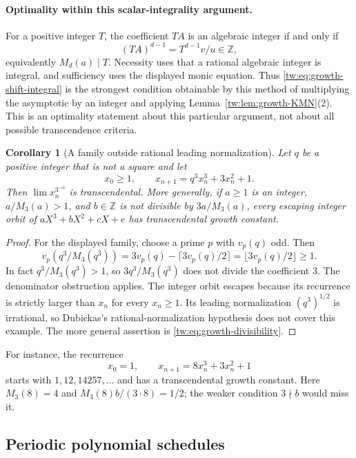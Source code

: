 \documentclass[11pt,a4paper]{article}
\newtheorem{corollary}[theorem]{Corollary}
\theoremstyle{definition}
\theoremstyle{remark}
\numberwithin{equation}{section}
\begin{document}
\paragraph{Optimality within this scalar-integrality argument.}
For a positive integer $T$, the coefficient $TA$ is an algebraic
integer if and only if
\[
 (TA)^{d-1}=T^{d-1}v/u\in\mathbb Z,
\]
equivalently $M_d(a)\mid T$.  Necessity uses that a rational algebraic
integer is integral, and sufficiency uses the displayed monic equation.
Thus \eqref{tw:eq:growth-shift-integral} is the strongest condition
obtainable by this method of multiplying the asymptotic by an integer
and applying Lemma~\ref{tw:lem:growth-KMN}(2).  This is an optimality
statement about this particular argument, not about all possible
transcendence criteria.

\begin{corollary}[A family outside rational leading normalization]
Let $q$ be a positive integer that is not a square and let
\[
 x_0\ge1,\qquad x_{n+1}=q^3x_n^3+3x_n^2+1.
\]
Then $\lim x_n^{3^{-n}}$ is transcendental.
More generally, if $a\ge1$ is an integer, $a/M_3(a)>1$, and
$b\in\mathbb Z$ is not divisible by $3a/M_3(a)$, every escaping
integer orbit of $aX^3+bX^2+cX+e$ has transcendental growth constant.
\end{corollary}

\begin{proof}
For the displayed family, choose a prime $p$ with $v_p(q)$ odd.
Then
\[
 v_p(q^3/M_3(q^3))
 =3v_p(q)-\lceil3v_p(q)/2\rceil
 =\lfloor3v_p(q)/2\rfloor\ge1.
\]
In fact $q^3/M_3(q^3)>1$, so $3q^3/M_3(q^3)$ does not divide
the coefficient $3$.  The denominator obstruction applies.
The integer orbit escapes because its recurrence is strictly larger
than $x_n$ for every $x_n\ge1$.  Its leading normalization
$(q^3)^{1/2}$ is irrational, so Dubickas's rational-normalization
hypothesis does not cover this example.  The more general assertion
is \eqref{tw:eq:growth-divisibility}.
\end{proof}

For instance, the recurrence
\[
 x_0=1,\qquad x_{n+1}=8x_n^3+3x_n^2+1
\]
starts with $1,12,14257,\ldots$ and has a transcendental growth
constant.  Here $M_3(8)=4$ and $M_3(8)b/(3\cdot8)=1/2$;
the weaker condition $3\nmid b$ would miss it.

\subsection{Periodic polynomial schedules}
\end{document}
